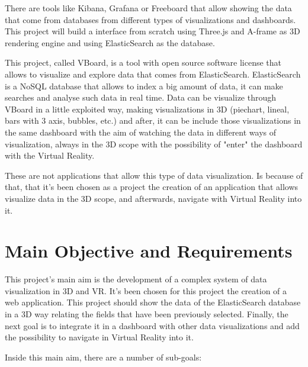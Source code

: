 \documentclass[a4paper, 12pt]{book}
\begin{document}
There are tools like Kibana, Grafana or Freeboard that allow showing the data that come from databases from different types of visualizations and dashboards. This project will build a interface from scratch using Three.js and A-frame as 3D rendering engine and using ElasticSearch as the database.

This project, called VBoard, is a tool with open source software license that allows to visualize and explore data that comes from ElasticSearch. ElasticSearch is a NoSQL database that allows to index a big amount of data, it can make searches and analyse such data in real time. Data can be visualize through VBoard in a little exploited way, making visualizations in 3D (piechart, lineal, bars with 3 axis, bubbles, etc.) and after, it can be include those visualizations in the same dashboard with the aim of watching the data in different ways of visualization, always in the 3D scope with the possibility of "enter" the dashboard with the Virtual Reality.

These are not applications that allow this type of data visualization. Is because of that, that it's been chosen as a project the creation of an application that allows visualize data in the 3D scope, and afterwards, navigate with Virtual Reality into it.

\section{Main Objective and Requirements}
\label{sec:mainobj}


This project's main aim is the development of a complex system of data visualization in 3D and VR. It's been chosen for this project the creation of a web application. This project should show the data of the ElasticSearch database in a 3D way relating the fields that have been previously selected. Finally, the next goal is to integrate it in a dashboard with other data visualizations and add the possibility to navigate in Virtual Reality into it.

Inside this main aim, there are a number of sub-goals:
\end{document}
